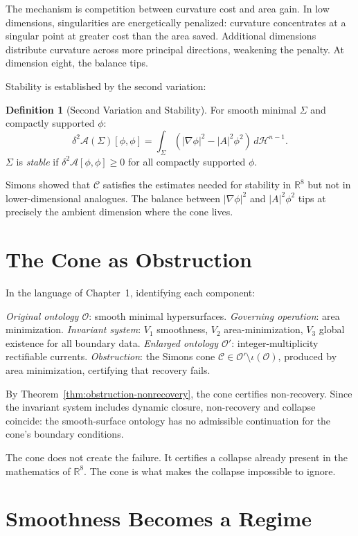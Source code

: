 \documentclass[12pt,oneside]{book}
\theoremstyle{plain}
\theoremstyle{definition}
\newtheorem{definition}[theorem]{Definition}
\theoremstyle{remark}
\newcommand{\Oold}{\mathcal{O}}
\newcommand{\Onew}{\mathcal{O}'}
\newcommand{\Real}{\mathbb{R}}
\begin{document}
The mechanism is competition between curvature cost and area gain. In low
dimensions, singularities are energetically penalized: curvature concentrates
at a singular point at greater cost than the area saved. Additional dimensions
distribute curvature across more principal directions, weakening the penalty.
At dimension eight, the balance tips.

Stability is established by the second variation:

\begin{definition}[Second Variation and Stability]
For smooth minimal $\Sigma$ and compactly supported $\phi$:
\[
  \delta^2\mathcal{A}(\Sigma)[\phi,\phi]
  = \int_\Sigma (|\nabla\phi|^2 - |A|^2\phi^2)\, d\mathcal{H}^{n-1}.
\]
$\Sigma$ is \emph{stable} if $\delta^2\mathcal{A}[\phi,\phi] \geq 0$ for
all compactly supported $\phi$.
\end{definition}

Simons showed that $\mathcal{C}$ satisfies the estimates needed for stability
in $\Real^8$ but not in lower-dimensional analogues. The balance between
$|\nabla\phi|^2$ and $|A|^2\phi^2$ tips at precisely the ambient dimension
where the cone lives.

\section{The Cone as Obstruction}

In the language of Chapter~1, identifying each component:

\emph{Original ontology $\Oold$}: smooth minimal hypersurfaces.
\emph{Governing operation}: area minimization.
\emph{Invariant system}: $V_1$ smoothness, $V_2$ area-minimization,
$V_3$ global existence for all boundary data.
\emph{Enlarged ontology $\Onew$}: integer-multiplicity rectifiable currents.
\emph{Obstruction}: the Simons cone $\mathcal{C} \in \Onew \setminus
\iota(\Oold)$, produced by area minimization, certifying that recovery fails.

By Theorem~\ref{thm:obstruction-nonrecovery}, the cone certifies non-recovery.
Since the invariant system includes dynamic closure, non-recovery and collapse
coincide: the smooth-surface ontology has no admissible continuation for the
cone's boundary conditions.

The cone does not create the failure. It certifies a collapse already present
in the mathematics of $\Real^8$. The cone is what makes the collapse
impossible to ignore.

\section{Smoothness Becomes a Regime}
\end{document}

